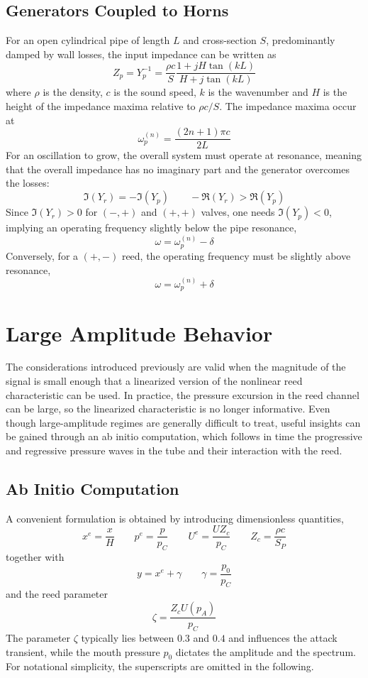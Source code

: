 \subsection{Generators Coupled to Horns}

For an open cylindrical pipe of length \( L \) and cross-section \( S \), predominantly damped by wall losses, the input impedance can be written as
\[
Z_p = Y_p^{-1}
= \frac{\rho c}{S}
\frac{1 + jH\tan(kL)}{H + j\tan(kL)}
\]
where \( \rho \) is the density, \( c \) is the sound speed, \( k \) is the wavenumber and \( H \) is the height of the impedance maxima relative to \( \rho c/S \). The impedance maxima occur at
\[
\omega_p^{(n)} = \frac{(2n+1)\pi c}{2L}
\]
For an oscillation to grow, the overall system must operate at resonance, meaning that the overall impedance has no imaginary part and the generator overcomes the losses:
\[
\Im(Y_r) = -\Im(Y_p)
\qquad
-\Re(Y_r) > \Re(Y_p)
\]
Since \( \Im(Y_r) > 0 \) for \( (-,+) \) and \( (+,+) \) valves, one needs \( \Im(Y_p) < 0 \), implying an operating frequency slightly below the pipe resonance,
\[
\omega = \omega_p^{(n)} - \delta
\]
Conversely, for a \( (+,-) \) reed, the operating frequency must be slightly above resonance,
\[
\omega = \omega_p^{(n)} + \delta
\]

\section{Large Amplitude Behavior}

The considerations introduced previously are valid when the magnitude of the signal is small enough that a linearized version of the nonlinear reed characteristic can be used. In practice, the pressure excursion in the reed channel can be large, so the linearized characteristic is no longer informative. Even though large-amplitude regimes are generally difficult to treat, useful insights can be gained through an ab initio computation, which follows in time the progressive and regressive pressure waves in the tube and their interaction with the reed.

\subsection{Ab Initio Computation}

A convenient formulation is obtained by introducing dimensionless quantities,
\[
x^{e} = \frac{x}{H}
\qquad
p^{e} = \frac{p}{p_{C}}
\qquad
U^{e} = \frac{U Z_{c}}{p_{C}}
\qquad
Z_{c} = \frac{\rho c}{S_{P}}
\]
together with
\[
y = x^{e} + \gamma
\qquad
\gamma = \frac{p_{0}}{p_{C}}
\]
and the reed parameter
\[
\zeta = \frac{Z_{c} U(p_{A})}{p_{C}}
\]
The parameter \( \zeta \) typically lies between \( 0.3 \) and \( 0.4 \) and influences the attack transient, while the mouth pressure \( p_{0} \) dictates the amplitude and the spectrum. For notational simplicity, the superscripts are omitted in the following.

